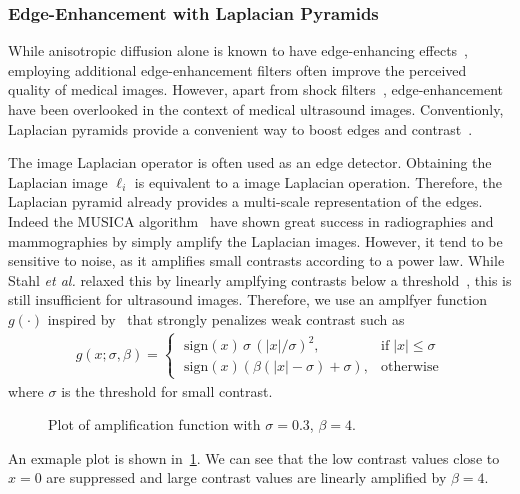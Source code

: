 \subsubsection{Edge-Enhancement with Laplacian Pyramids}
%
While anisotropic diffusion alone is known to have edge-enhancing effects~\cite{weickert_anisotropic_1998}, employing additional edge-enhancement filters often improve the perceived quality of medical images.
However, apart from shock filters~\cite{zhang_multiscale_2006, kang_new_2016}, edge-enhancement have been overlooked in the context of medical ultrasound images.
Conventionly, Laplacian pyramids provide a convenient way to boost edges and contrast~\cite{vuylsteke_multiscale_1994, stahl_noiseresistant_1999, dippel_multiscale_2002}.

The image Laplacian operator is often used as an edge detector.
Obtaining the Laplacian image \({\boldsymbol\ell_i}\) is equivalent to a image Laplacian operation.
Therefore, the Laplacian pyramid already provides a multi-scale representation of the edges.
Indeed the MUSICA algorithm~\cite{vuylsteke_multiscale_1994} have shown great success in radiographies and mammographies by simply amplify the Laplacian images.
However, it tend to be sensitive to noise, as it amplifies small contrasts according to a power law.
While Stahl \textit{et al.} relaxed this by linearly amplfying contrasts below a threshold~\cite{stahl_noiseresistant_1999}, this is still insufficient for ultrasound images.
Therefore, we use an amplfyer function \(g\left(\cdot\right)\) inspired by~\cite{10.1145/2010324.1964963} that strongly penalizes weak contrast such as
\begin{align}
  g\left(x; \sigma, \beta \right) =
  \begin{cases}
    \;\mathrm{sign}\left( x \right) \, \sigma \, {\left( |x|/\sigma \right)}^2, & \text{if}\; |x| \leq \sigma \\
    \;\mathrm{sign}\left( x \right) \left( \beta \left(|x| - \sigma \right) + \sigma \right), & \text{otherwise}
  \end{cases}
\end{align}
where \(\sigma\) is the threshold for small contrast.
%
\begin{figure}[H]
  \centering
  \caption{Plot of amplification function with \(\sigma=0.3\), \(\beta=4\).}\label{fig:amp}
\end{figure}
%
An exmaple plot is shown in~\cref{fig:amp}.
We can see that the low contrast values close to \(x=0\) are suppressed and large contrast values are linearly amplified by \(\beta=4\).

